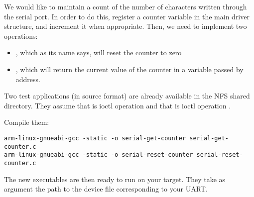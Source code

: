 We would like to maintain a count of the number of characters
written through the serial port. In order to do this, register a counter
variable in the main driver structure, and increment it when
appropriate. Then, we need to implement two 
operations:
\begin{itemize}

 \item {}, which as its name says, will
   reset the counter to zero

 \item {}, which will return the current
   value of the counter in a variable passed by address.

\end{itemize}

Two test applications (in source format) are already available in the
 NFS shared directory.
They assume that  is ioctl operation 
and that  is ioctl operation .

Compile them:

\begin{verbatim}
arm-linux-gnueabi-gcc -static -o serial-get-counter serial-get-counter.c
arm-linux-gnueabi-gcc -static -o serial-reset-counter serial-reset-counter.c
\end{verbatim}

The new executables are then ready to run on your target. They take as
argument the path to the device file corresponding to your UART.
